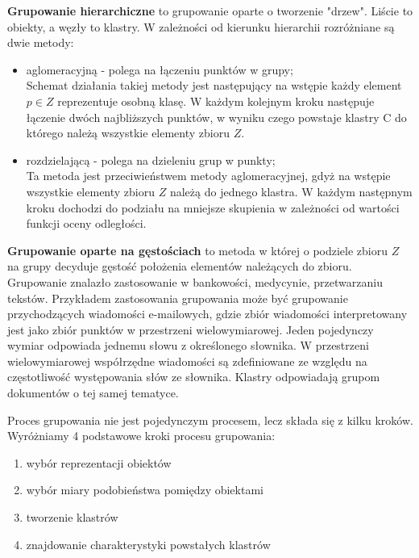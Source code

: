 \documentclass[twoside]{pracaMagisterskaMS}
\begin{document}
\textbf{Grupowanie hierarchiczne} to grupowanie oparte o tworzenie "drzew". Liście to obiekty, a węzły to klastry. W zależności od kierunku hierarchii rozróżniane są dwie metody:
\begin{itemize}
\item aglomeracyjną - polega na łączeniu punktów w grupy;\\
	Schemat działania takiej metody jest następujący na wstępie każdy element $p \in Z$ reprezentuje osobną klasę. W każdym kolejnym kroku następuje łączenie dwóch najbliższych punktów, w wyniku czego powstaje klastry C do którego należą wszystkie elementy zbioru $Z$.
\item rozdzielającą - polega na dzieleniu grup w punkty;\\
	Ta metoda jest przeciwieństwem metody aglomeracyjnej, gdyż na wstępie wszystkie elementy zbioru $Z$ należą do jednego klastra. W każdym następnym kroku dochodzi do podziału na mniejsze skupienia w zależności od wartości funkcji oceny odległości.
\end{itemize}


\textbf{Grupowanie oparte na gęstościach} to metoda w której o podziele zbioru $Z$ na grupy decyduje gęstość położenia elementów należących do zbioru. \\ %


Grupowanie znalazło zastosowanie w bankowości, medycynie, przetwarzaniu tekstów. Przykładem zastosowania grupowania może być grupowanie przychodzących wiadomości e-mailowych, gdzie zbiór wiadomości interpretowany jest jako zbiór punktów w przestrzeni wielowymiarowej. Jeden pojedynczy wymiar odpowiada jednemu słowu z określonego słownika. W przestrzeni wielowymiarowej współrzędne wiadomości są zdefiniowane ze względu na częstotliwość występowania słów ze słownika. Klastry odpowiadają grupom dokumentów o tej samej tematyce.

Proces grupowania nie jest pojedynczym procesem, lecz składa się z kilku kroków. Wyróżniamy 4 podstawowe kroki procesu grupowania:
\begin{enumerate}
\item wybór reprezentacji obiektów
\item wybór miary podobieństwa pomiędzy obiektami
\item tworzenie klastrów
\item znajdowanie charakterystyki powstałych klastrów
\end{enumerate}
\end{document}
